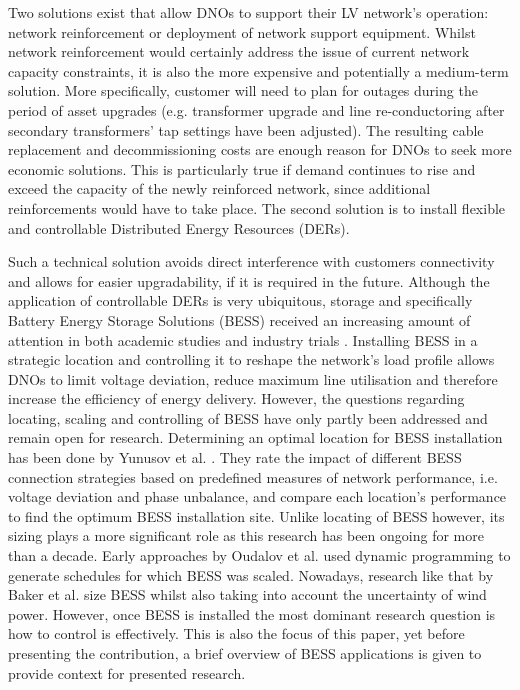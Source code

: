 Two solutions exist that allow DNOs to support their LV network's operation: network reinforcement or deployment of network support equipment.
Whilst network reinforcement would certainly address the issue of current network capacity constraints, it is also the more expensive and potentially a medium-term solution.
More specifically, customer will need to plan for outages during the period of asset upgrades (e.g. transformer upgrade and line re-conductoring after secondary transformers' tap settings have been adjusted).
The resulting cable replacement and decommissioning costs are enough reason for DNOs to seek more economic solutions.
This is particularly true if demand continues to rise and exceed the capacity of the newly reinforced network, since additional reinforcements would have to take place.
The second solution is to install flexible and controllable Distributed Energy Resources (DERs).

Such a technical solution avoids direct interference with customers connectivity and allows for easier upgradability, if it is required in the future.
Although the application of controllable DERs is very ubiquitous, storage and specifically Battery Energy Storage Solutions (BESS) received an increasing amount of attention in both academic studies and industry trials \cite{Palizban2016}.
Installing BESS in a strategic location and controlling it to reshape the network's load profile allows DNOs to limit voltage deviation, reduce maximum line utilisation and therefore increase the efficiency of energy delivery.
However, the questions regarding locating, scaling and controlling of BESS have only partly been addressed and remain open for research.
Determining an optimal location for BESS installation has been done by Yunusov et al. \cite{Yunusov2016}.
They rate the impact of different BESS connection strategies based on predefined measures of network performance, i.e. voltage deviation and phase unbalance, and compare each location's performance to find the optimum BESS installation site.
Unlike locating of BESS however, its sizing plays a more significant role as this research has been ongoing for more than a decade.
Early approaches by Oudalov et al. \cite{Oudalov2007} used dynamic programming to generate schedules for which BESS was scaled.
Nowadays, research like that by Baker et al. \cite{Baker2017} size BESS whilst also taking into account the uncertainty of wind power.
However, once BESS is installed the most dominant research question is how to control is effectively.
This is also the focus of this paper, yet before presenting the contribution, a brief overview of BESS applications is given to provide context for presented research.

